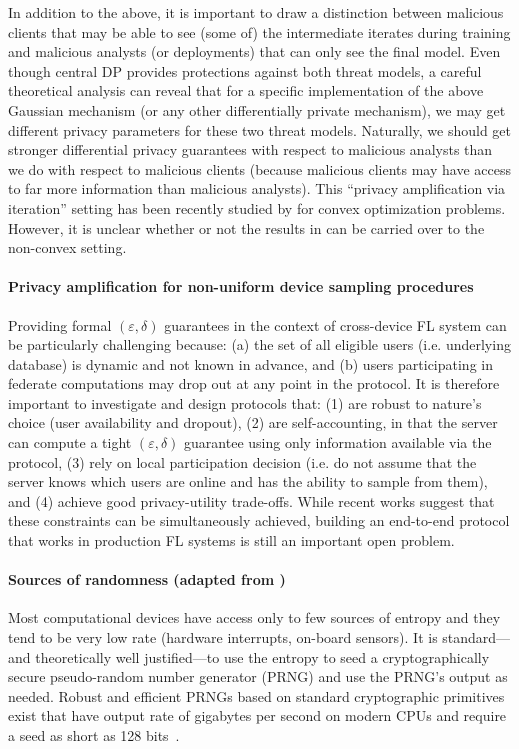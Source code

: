 \documentclass[11pt]{article}
\begin{document}
In addition to the above, it is important to draw a distinction between malicious clients that may be able to see (some of) the intermediate iterates during training and malicious analysts (or deployments) that can only see the final model. Even though central DP provides protections against both threat models, a careful theoretical analysis can reveal that for a specific implementation of the above Gaussian mechanism (or any other differentially private mechanism), we may get different privacy parameters for these two threat models. Naturally, we should get stronger differential privacy guarantees with respect to malicious analysts than we do with respect to malicious clients (because malicious clients may have access to far more information than malicious analysts). This ``privacy amplification via iteration'' setting has been recently studied by \citet{feldman2018privacy} for convex optimization problems. However, it is unclear whether or not the results in \cite{feldman2018privacy} can be carried over to the non-convex setting.


\paragraph{Privacy amplification for non-uniform device sampling procedures}
Providing formal $(\varepsilon, \delta)$ guarantees in the context of cross-device FL system can be particularly challenging because: (a) the set of all eligible users (i.e. underlying database) is dynamic and not known in advance, and (b) users participating in federate computations may drop out at any point in the protocol. It is therefore important to investigate and design protocols that: (1) are robust to nature’s choice (user availability and dropout), (2) are self-accounting, in that the  server  can  compute a tight $(\varepsilon, \delta)$ guarantee using only information available via the protocol, (3) rely on local participation decision (i.e. do not assume that the server knows which users are online and has the ability to sample from them), and (4) achieve good privacy-utility trade-offs. While recent works \cite{balle2020privacy, kairouz2021practical} suggest that these constraints can be simultaneously achieved, building an end-to-end protocol that works in production FL systems is still an important open problem.

\paragraph{Sources of randomness (adapted from \cite{mcmahan2018general})}
Most computational devices have access only to few sources of entropy and they tend to be very low rate (hardware interrupts, on-board sensors). It is standard---and theoretically well justified---to use the entropy to seed a cryptographically secure pseudo-random number generator (PRNG) and use the PRNG's output as needed. Robust and efficient PRNGs based on standard cryptographic primitives exist that have output rate of gigabytes per second on modern CPUs and require a seed as short as 128 bits~\citep{salmon2011parallel}. 
\end{document}
